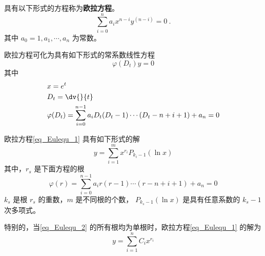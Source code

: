 

具有以下形式的方程称为\textbf{欧拉方程}。
\begin{equation}\label{eq_Eulequ_1}
\sum_{i=0}^{n}a_ix^{n-i}y^{(n-i)}=0~.
\end{equation}
其中 $a_0=1,a_1,\cdots,a_n$ 为常数。

欧拉方程可化为具有如下形式的常系数线性方程
\begin{equation}\label{eq_Eulequ_4}
\varphi(D_t)y=0
\end{equation}
其中
\begin{equation}
\begin{aligned}
&x=e^t\\
&D_t=\dv{}{t}\\
&\varphi(D_t)=\sum_{i=0}^{n-1}a_iD_t(D_t-1)\cdots(D_t-n+i+1)+a_n=0
\end{aligned}
\end{equation}

欧拉方程\autoref{eq_Eulequ_1} 具有如下形式的解
\begin{equation}\label{eq_Eulequ_6}
y=\sum_{i=1}^mx^{r_i}P_{k_i-1}(\ln x)
\end{equation}
其中，$r_s$ 是下面方程的根
\begin{equation}\label{eq_Eulequ_2}
\varphi(r)=\sum_{i=0}^{n-1}a_ir(r-1)\cdots(r-n+i+1)+a_n=0
\end{equation}
$k_s$ 是根 $r_s$ 的重数，$m$ 是不同根的个数， $P_{k_s-1}(\ln x)$ 是具有任意系数的 $k_s-1$ 次多项式。 

特别的，当\autoref{eq_Eulequ_2} 的所有根均为单根时，欧拉方程\autoref{eq_Eulequ_1} 的解为
\begin{equation}
y=\sum_{i=1}^{n}C_ix^{r_i}
\end{equation}


